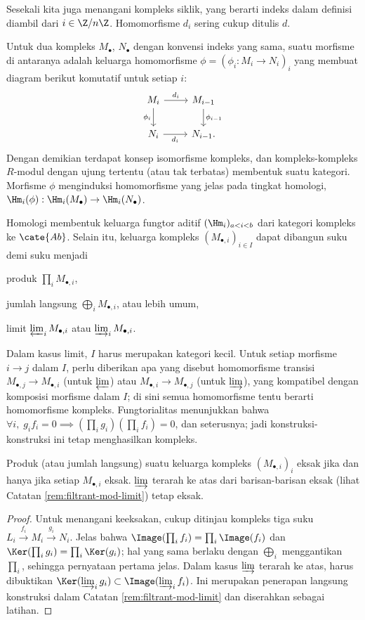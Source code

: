 Sesekali kita juga menangani kompleks siklik, yang berarti indeks dalam definisi diambil dari $i \in \Z/n\Z$. Homomorfisme $d_i$ sering cukup ditulis $d$.
\begin{definition}
	Untuk dua kompleks $M_\bullet$, $N_\bullet$ dengan konvensi indeks yang sama, suatu morfisme di antaranya adalah keluarga homomorfisme $\phi = (\phi_i: M_i \to N_i)_i$ yang membuat diagram berikut komutatif untuk setiap $i$:
	\[ \begin{tikzcd}
	M_i \arrow[r, "d_i"] \arrow[d, "{\phi_i}"'] & M_{i-1} \arrow[d, "{\phi_{i-1}}"] \\
	N_i \arrow[r, "d_i"'] & N_{i-1}.
	\end{tikzcd}\]
	Dengan demikian terdapat konsep isomorfisme kompleks, dan kompleks-kompleks $R$-modul dengan ujung tertentu (atau tak terbatas) membentuk suatu kategori. Morfisme $\phi$ menginduksi homomorfisme yang jelas pada tingkat homologi, $\Hm_i(\phi): \Hm_i(M_\bullet) \to \Hm_i(N_\bullet)$.
\end{definition}
Homologi membentuk keluarga fungtor aditif $(\Hm_i)_{a<i<b}$ dari kategori kompleks ke $\cate{Ab}$. Selain itu, keluarga kompleks $(M_{\bullet,i})_{i \in I}$ dapat dibangun suku demi suku menjadi
\begin{compactitem}
	\item produk $\prod_i M_{\bullet,i}$,
	\item jumlah langsung $\bigoplus_i M_{\bullet,i}$, atau lebih umum,
	\item limit $\varprojlim_i M_{\bullet,i}$ atau $\varinjlim_i M_{\bullet,i}$.
\end{compactitem}
Dalam kasus limit, $I$ harus merupakan kategori kecil. Untuk setiap morfisme $i \to j$ dalam $I$, perlu diberikan apa yang disebut homomorfisme transisi $M_{\bullet,j} \to M_{\bullet,i}$ (untuk $\varprojlim$) atau $M_{\bullet,i} \to M_{\bullet,j}$ (untuk $\varinjlim$), yang kompatibel dengan komposisi morfisme dalam $I$; di sini semua homomorfisme tentu berarti homomorfisme kompleks. Fungtorialitas menunjukkan bahwa $\forall i, \; g_i f_i = 0 \implies (\prod_i g_i) (\prod_i f_i)=0$, dan seterusnya; jadi konstruksi-konstruksi ini tetap menghasilkan kompleks.

\begin{lemma}\label{prop:mod-prod-exactness}
	Produk (atau jumlah langsung) suatu keluarga kompleks $(M_{\bullet,i})_i$ eksak jika dan hanya jika setiap $M_{\bullet,i}$ eksak. $\varinjlim$ terarah ke atas dari barisan-barisan eksak (lihat Catatan \ref{rem:filtrant-mod-limit}) tetap eksak.
\end{lemma}
\begin{proof}
	Untuk menangani keeksakan, cukup ditinjau kompleks tiga suku $L_i \xrightarrow{f_i} M_i \xrightarrow{g_i} N_i$. Jelas bahwa $\Image(\prod_i f_i) = \prod_i \Image(f_i)$ dan $\Ker(\prod_i g_i) = \prod_i \Ker(g_i)$; hal yang sama berlaku dengan $\bigoplus_i$ menggantikan $\prod_i$, sehingga pernyataan pertama jelas. Dalam kasus $\varinjlim$ terarah ke atas, harus dibuktikan $\Ker(\varinjlim_i g_i) \subset \Image(\varinjlim_i f_i)$. Ini merupakan penerapan langsung konstruksi dalam Catatan \ref{rem:filtrant-mod-limit} dan diserahkan sebagai latihan.
\end{proof}

